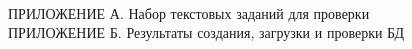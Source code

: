 \tableofcontents
\hspace{0pt}\\
ПРИЛОЖЕНИЕ А. Набор текстовых заданий для проверки\\
ПРИЛОЖЕНИЕ Б. Результаты создания, загрузки и проверки БД\\
\newpage
